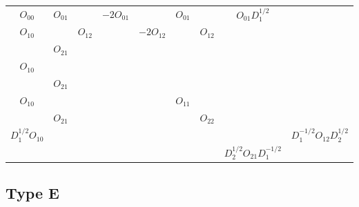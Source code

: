 \begin{tabular}{ccc|cc|cc|cc}
    $O_{00}$               & $O_{01} $   &             & $-2  O_{01}$ &                & $ O_{01}$ &             & $ O_{01}  D_1^{1/2}$           &                                \\
    ${O_{10}}$             &             & ${ O_{12}}$ &              & $-2 { O_{12}}$ &           & ${ O_{12}}$ &                                &                                \\
                           & ${ O_{21}}$ &             &              &                &           &             &                                &                                \\
    \hline
    ${O_{10}}$             &             &             &              &                &           &             &                                &                                \\
                           & ${ O_{21}}$ &             &              &                &           &             &                                &                                \\
    \hline
    ${ O_{10}}$            &             &             &              &                & $O_{11}$  &             &                                &                                \\
                           & ${ O_{21}}$ &             &              &                &           & $O_{22}$    &                                &                                \\
    \hline
    $ D_1^{1/2} { O_{10}}$ &             &             &              &                &           &             &                                & $D_1^{-1/2} O_{12}  D_2^{1/2}$ \\
                           &             &             &              &                &           &             & $ D_2^{1/2} O_{21} D_1^{-1/2}$                                  \\\end{tabular}


\subsection{Type E}

